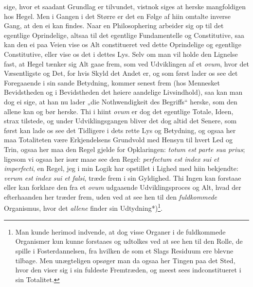 \documentclass[12pt,a4paper]{book}
\newcommand{\apage}[1]{\marginnote{\footnotesize\textit{[#1]}}}
\begin{document}
sige, hvor et saadant Grundlag er tilvundet, vistnok siges at herske
mangfoldigen hos Hegel. Men i Gangen i det Større er det en Følge af
hiin omtalte inverse Gang, at den ei kan findes. Naar en
Philosophering arbeider sig op til det egentlige Oprindelige, altsaa
til det egentlige Fundamentelle og Constitutive, saa kan den ei paa
Veien vise os Alt constitueret ved dette Oprindelige og egentlige
Constitutive, eller vise os det i dettes Lys. Selv om man vil holde
den Lignelse fast, at Hegel tænker sig Alt gaae frem, som ved
Udviklingen af et \textit{ovum}, hvor det Væsentligste og Det, for
hvis Skyld det Andet er, og som først lader os see det Foregaaende i
sin sande Betydning, kommer senest frem (hos Mennesket Bevidstheden og
i Bevidstheden det høiere aandelige Livsindhold), saa kan man dog ei
sige, at han nu lader „die Nothwendigkeit des Begriffs“ herske, som
den allene kan og bør herske. Thi i hiint \textit{ovum} er dog det
egentlige Totale, Ideen, strax tilstede, og under Udviklingsgangen
bliver det dog altid det Senere, som først kan lade os see det
Tidligere i dets rette Lys og Betydning, og ogsaa her maa Totaliteten
være Erkjendelsens Grundvold med Hensyn til hvert \apage{40} Led og Trin, ogsaa
her maa den Regel gjelde for Opklaringen: \textit{totum est parte sua
prius}; ligesom vi ogsaa her især maae see den Regel: \textit{perfectum
est index sui et imperfecti}, en Regel, jeg i min Logik har opstillet i
Lighed med hiin bekjendte: \textit{verum est index sui et falsi}, træde
frem i sin Gyldighed. Thi Ingen kan forstaae eller kan forklare den
fra et \textit{ovum} udgaaende Udviklingsproces og Alt, hvad der
efterhaanden her træder frem, uden ved at see hen til den \emph{fuldkommede}
Organismus, hvor det \emph{allene} finder sin Udtydning*)\footnote{Man kunde
herimod indvende, at dog visse Organer i de fuldkommede Organismer kun
kunne forstaaes og udtolkes ved at see hen til den Rolle, de spille i
Fosterdannelsen, fra hvilken de som et Slags Residuum ere blevne
tilbage. Men unægteligen opsøger man da ogsaa her Tingen paa det Sted,
hvor den viser sig i sin fuldeste Fremtræden, og meest sees
indconstitueret i sin Totalitet.}.
\end{document}
